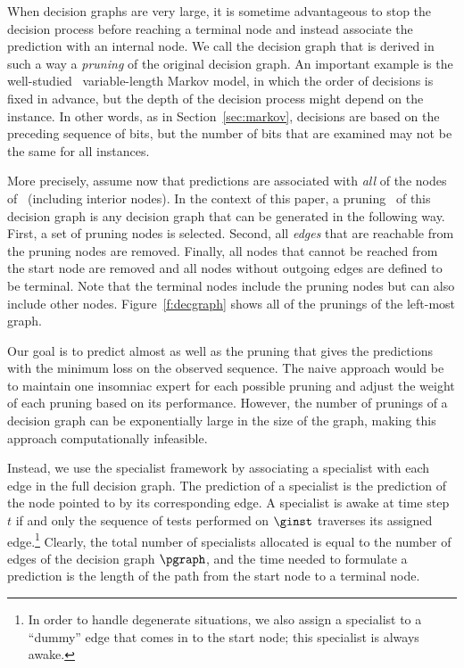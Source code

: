 When decision graphs are very large, it is sometime advantageous to
stop the decision process before reaching a terminal node and
instead associate the prediction with an internal node. We call the
decision graph that is derived in such a way a {\em pruning} of the
original decision graph. An important
example is the well-studied~\cite{RissanenLa81,WeinbergerLeZi92,MerhavFeGu93,RonSiTi94,WillemsShTj95}
variable-length Markov model, in
which the order of 
decisions is fixed in advance, but the depth of the decision process
might depend on the instance.
In other words, as in Section~\ref{sec:markov}, decisions are based on the
preceding sequence of bits, but the number of bits that are examined
may not be the same for all instances.

More precisely, assume now that predictions are
associated with {\em all\/} of the nodes of \pgraph\ (including interior nodes).
In the context of this paper, a
pruning \prun\ of this decision graph is any decision graph that can be
generated in the following way. First, a set of pruning nodes is
selected. Second, all {\em edges\/} that are reachable from the pruning nodes
are removed. Finally, all nodes that cannot be reached from the start
node are removed and all nodes without outgoing edges are defined to
be terminal. Note that the terminal nodes include the pruning nodes
but can also include other nodes. Figure~\ref{f:decgraph} shows
all of the prunings of the left-most graph.

Our goal is to predict almost as well as the pruning that gives the
predictions with the minimum loss on the observed sequence.
The naive approach would be to maintain one insomniac expert for each
possible pruning
and adjust the weight of each pruning based on its performance. However,
the number of prunings of a decision graph can be exponentially large
in the size of the graph, making this approach 
computationally infeasible.

Instead, we use the specialist framework by associating a specialist
with each edge in the full decision graph.
The prediction of a specialist is the prediction of the node pointed to
by its corresponding edge.
A specialist is awake at time step $t$ if and only the sequence of
tests performed on $\ginst$ traverses its assigned edge.\footnote{In
order to handle degenerate situations, we also assign a specialist to a
``dummy'' edge that comes in to the start node; this specialist is
always awake.}
Clearly, the total number of specialists allocated is equal to
the number of edges of the decision graph $\pgraph$, and the time
needed to formulate a
prediction is the length of the path from the start node to a terminal node.


